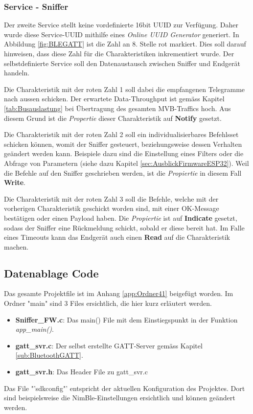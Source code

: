 \subsubsection{Service - Sniffer}
Der zweite Service stellt keine vordefinierte 16bit UUID zur Verfügung. Daher wurde diese Service-UUID mithilfe eines \textit{Online UUID Generator} generiert. In Abbildung \ref{fig:BLEGATT} ist die Zahl an 8. Stelle rot markiert. Dies soll darauf hinweisen, dass diese Zahl für die Charakteristiken inkrementiert wurde. Der selbstdefinierte Service soll den Datenaustausch zwischen Sniffer und Endgerät handeln. 

Die Charakteristik mit der roten Zahl 1 soll dabei die empfangenen Telegramme nach aussen schicken. Der erwartete Data-Throughput ist gemäss Kapitel \ref{tab:Busauslastung} bei Übertragung des gesamten MVB-Traffics hoch. Aus diesem Grund ist die \textit{Propertie} dieser Charakteristik auf \textbf{Notify} gesetzt.

Die Charakteristik mit der roten Zahl 2 soll ein individualisierbares Befehlsset schicken können, womit der Sniffer gesteuert, beziehungsweise dessen Verhalten geändert werden kann. Beispiele dazu sind die Einstellung eines Filters oder die Abfrage von Parametern (siehe dazu Kapitel \ref{sec:AusblickFirmwareESP32}). Weil die Befehle auf den Sniffer geschrieben werden, ist die \textit{Propiertie} in diesem Fall \textbf{Write}.

Die Charakteristik mit der roten Zahl 3 soll die Befehle, welche mit der vorherigen Charakteristik geschickt worden sind, mit einer OK-Message bestätigen oder einen Payload haben. Die \textit{Propiertie} ist auf \textbf{Indicate} gesetzt, sodass der Sniffer eine Rückmeldung schickt, sobald er diese bereit hat. Im Falle eines Timeouts kann das Endgerät auch einen \textbf{Read} auf die Charakteristik machen.



\subsection{Datenablage Code}
\label{sub:DatenablageCodeESP32S3}
Das gesamte Projektfile ist im Anhang \ref{app:Ordner41} beigefügt worden. Im Ordner "main" sind 3 Files ersichtlich, die hier kurz erläutert werden.
\begin{itemize}
    \item \textbf{Sniffer\_FW.c}: Das main() File mit dem Einstiegspunkt in der Funktion \textit{app\_main()}.
    \item \textbf{gatt\_svr.c}: Der selbst erstellte GATT-Server gemäss Kapitel \ref{sub:BluetoothGATT}.
    \item \textbf{gatt\_svr.h}: Das Header File zu gatt\_svr.c
\end{itemize}

Das File "'sdkconfig"' entspricht der aktuellen Konfiguration des Projektes. Dort sind beispielsweise die NimBle-Einstellungen ersichtlich und können geändert werden. 